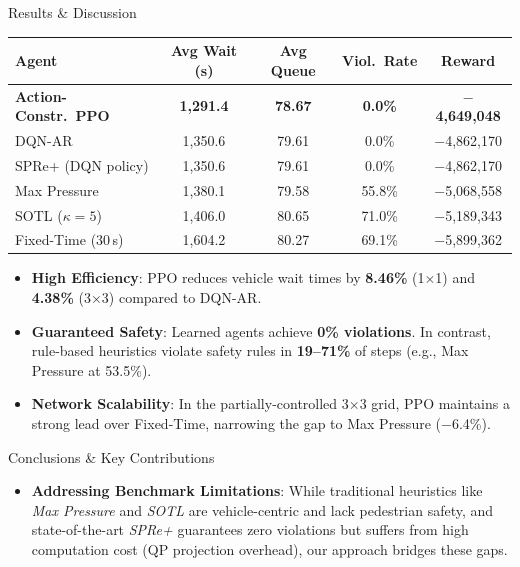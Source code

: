 \documentclass[final,18pt]{beamer}
\newlength{\colwidth}
\begin{document}
\begin{frame}[t]
\begin{columns}[t]
\begin{column}{\colwidth}
\begin{block}{Results \& Discussion}
    \vspace{0.6cm}

    \begin{center}
    \begin{tabular}{lcccc}
      \toprule
      \textbf{Agent} & \textbf{Avg Wait (s)} & \textbf{Avg Queue}
                     & \textbf{Viol.\ Rate}  & \textbf{Reward} \\
      \midrule
      \textbf{Action-Constr.\ PPO} & \textbf{1,291.4} & \textbf{78.67}
                                   & \textbf{0.0\%}   & \textbf{$-$4,649,048} \\
      DQN-AR             & 1,350.6 & 79.61 & 0.0\%  & $-$4,862,170 \\
      SPRe+ (DQN policy) & 1,350.6 & 79.61 & 0.0\%  & $-$4,862,170 \\
      Max Pressure       & 1,380.1 & 79.58 & 55.8\% & $-$5,068,558 \\
      SOTL ($\kappa\!=\!5$) & 1,406.0 & 80.65 & 71.0\% & $-$5,189,343 \\
      Fixed-Time (30\,s) & 1,604.2 & 80.27 & 69.1\% & $-$5,899,362 \\
      \bottomrule
    \end{tabular}
    \end{center}

\vspace{0.3cm}
\begin{itemize}
  \item \textbf{High Efficiency}: PPO reduces vehicle wait times by \textbf{8.46\%} (1$\times$1) and \textbf{4.38\%} (3$\times$3) compared to DQN-AR.
  \item \textbf{Guaranteed Safety}: Learned agents achieve \textbf{0\% violations}. In contrast, rule-based heuristics violate safety rules in \textbf{19--71\%} of steps (e.g., Max Pressure at 53.5\%).
  \item \textbf{Network Scalability}: In the partially-controlled 3$\times$3 grid, PPO maintains a strong lead over Fixed-Time, narrowing the gap to Max Pressure ($-$6.4\%).
\end{itemize}

  \end{block}

\begin{block}{Conclusions \& Key Contributions}
  \begin{itemize}
    \item \textbf{Addressing Benchmark Limitations}: 
      While traditional heuristics like \textit{Max Pressure} and \textit{SOTL} are vehicle-centric and lack pedestrian safety, and state-of-the-art \textit{SPRe+} guarantees zero violations but suffers from high computation cost (QP projection overhead), our approach bridges these gaps.
      

\end{itemize}
\end{block}
\end{column}
\end{columns}
\end{frame}
\end{document}
